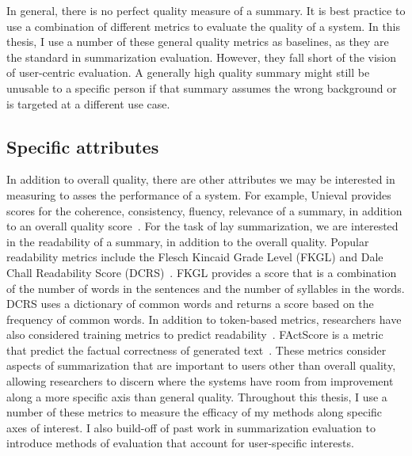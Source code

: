 In general, there is no perfect quality measure of a summary. It is best practice to use a combination of different metrics to evaluate the quality of a system. In this thesis, I use a number of these general quality metrics as baselines, as they are the standard in summarization evaluation. However, they fall short of the vision of user-centric evaluation. A generally high quality summary might still be unusable to a specific person if that summary assumes the wrong background or is targeted at a different use case. 

\subsection{Specific attributes}
In addition to overall quality, there are other attributes we may be interested in measuring to asses the performance of a system. For example, Unieval provides scores for the coherence, consistency, fluency, relevance of a summary, in addition to an overall quality score~\cite{Zhong2022TowardsAU}. For the task of lay summarization, we are interested in the readability of a summary, in addition to the overall quality. Popular readability metrics include the Flesch Kincaid Grade Level (FKGL) and Dale Chall Readability Score (DCRS)~\cite{goldsack2022making}. FKGL provides a score that is a combination of the number of words in the sentences and the number of syllables in the words. DCRS uses a dictionary of common words and returns a score based on the frequency of common words. In addition to token-based metrics, researchers have also considered training metrics to predict readability~\cite{Imperial2021BERTEF}.
FActScore is a metric that predict the factual correctness of generated text~\cite{min2023factscore}. These metrics consider aspects of summarization that are important to users other than overall quality, allowing researchers to discern where the systems have room from improvement along a more specific axis than general quality. Throughout this thesis, I use a number of these metrics to measure the efficacy of my methods along specific axes of interest. I also build-off of past work in summarization evaluation to introduce methods of evaluation that account for user-specific interests.